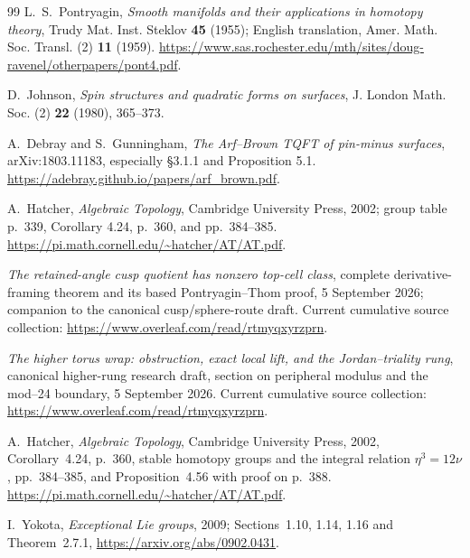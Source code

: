 \begin{thebibliography}{99}
L.~S.~Pontryagin,
\emph{Smooth manifolds and their applications in homotopy theory},
Trudy Mat. Inst. Steklov \textbf{45} (1955);
English translation, Amer. Math. Soc. Transl. (2) \textbf{11} (1959).
\url{https://www.sas.rochester.edu/mth/sites/doug-ravenel/otherpapers/pont4.pdf}.

D.~Johnson, \emph{Spin structures and quadratic forms on surfaces},
J. London Math. Soc. (2) \textbf{22} (1980), 365--373.

A.~Debray and S.~Gunningham,
\emph{The Arf--Brown TQFT of pin-minus surfaces},
arXiv:1803.11183, especially \S3.1.1 and Proposition 5.1.
\url{https://adebray.github.io/papers/arf_brown.pdf}.

A.~Hatcher, \emph{Algebraic Topology}, Cambridge University Press,
2002; group table p.~339, Corollary 4.24, p.~360, and pp.~384--385.
\url{https://pi.math.cornell.edu/~hatcher/AT/AT.pdf}.

\emph{The retained-angle cusp quotient has nonzero top-cell class},
complete derivative-framing theorem and its based
Pontryagin--Thom proof, 5 September 2026;
companion to the canonical cusp/sphere-route draft.
Current cumulative source collection:
\url{https://www.overleaf.com/read/rtmyqxyrzprn}.

\emph{The higher torus wrap: obstruction, exact local lift, and the
Jordan--triality rung},
canonical higher-rung research draft, section on peripheral
modulus and the mod--24 boundary, 5 September 2026.
Current cumulative source collection:
\url{https://www.overleaf.com/read/rtmyqxyrzprn}.

A.~Hatcher, \emph{Algebraic Topology}, Cambridge University Press,
2002, Corollary~4.24, p.~360, stable homotopy groups and the
integral relation \(\eta^3=12\nu\), pp.~384--385,
and Proposition~4.56 with proof on p.~388.
\url{https://pi.math.cornell.edu/~hatcher/AT/AT.pdf}.

I.~Yokota, \emph{Exceptional Lie groups}, 2009;
Sections~1.10, 1.14, 1.16 and Theorem~2.7.1,
\url{https://arxiv.org/abs/0902.0431}.


\end{thebibliography}
\endgroup
